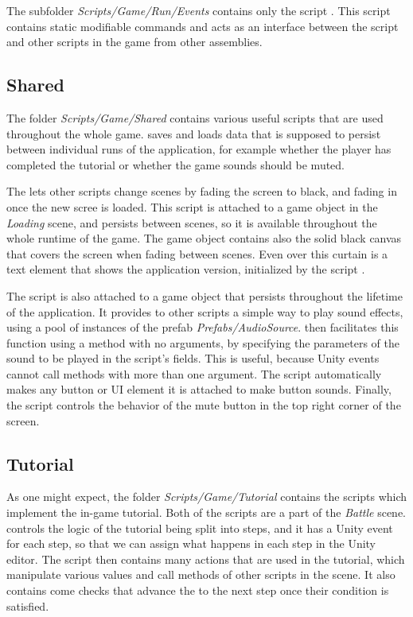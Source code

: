 The subfolder \emph{Scripts/Game/Run/Events} contains only the script .
This script contains static modifiable commands and acts as an interface between the  script and other scripts in the game from other assemblies.

\subsection{Shared}

The folder \emph{Scripts/Game/Shared} contains various useful scripts that are used throughout the whole game.
 saves and loads data that is supposed to persist between individual runs of the application, for example whether the player has completed the tutorial or whether the game sounds should be muted.

The  lets other scripts change scenes by fading the screen to black, and fading in once the new scree is loaded.
This script is attached to a game object in the \emph{Loading} scene, and persists between scenes, so it is available throughout the whole runtime of the game.
The game object contains also the solid black canvas that covers the screen when fading between scenes.
Even over this curtain is a text element that shows the application version, initialized by the script .

The script  is also attached to a game object that persists throughout the lifetime of the application.
It provides to other scripts a simple way to play sound effects, using a pool of instances of the prefab \emph{Prefabs/AudioSource}.
 then facilitates this function using a method with no arguments, by specifying the parameters of the sound to be played in the script's fields.
This is useful, because Unity events cannot call methods with more than one argument.
The script  automatically makes any button or UI element it is attached to make button sounds.
Finally, the script  controls the behavior of the mute button in the top right corner of the screen.

\subsection{Tutorial}

As one might expect, the folder \emph{Scripts/Game/Tutorial} contains the scripts which implement the in-game tutorial.
Both of the scripts are a part of the \emph{Battle} scene.
 controls the logic of the tutorial being split into steps, and it has a Unity event for each step, so that we can assign what happens in each step in the Unity editor.
The script  then contains many actions that are used in the tutorial, which manipulate various values and call methods of other scripts in the scene.
It also contains come checks that advance the  to the next step once their condition is satisfied.

